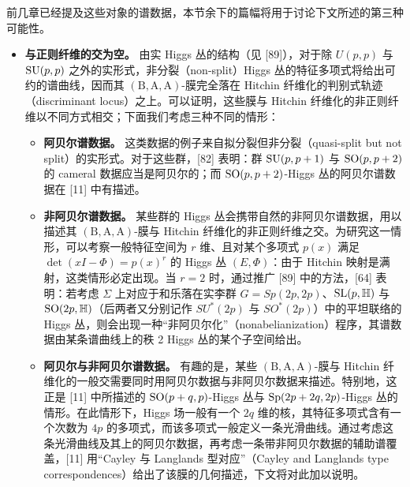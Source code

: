 
前几章已经提及这些对象的谱数据，本节余下的篇幅将用于讨论下文所述的第三种可能性。

\begin{itemize}[leftmargin=1.4em,itemsep=1pt,topsep=1pt]
\item \textbf{与正则纤维的交为空。} 由实 Higgs 丛的结构（见 [89]），对于除 $U(p,p)$ 与 $\mathrm{SU}(p,p)$ 之外的实形式，非分裂（non-split）Higgs 丛的特征多项式将给出可约的谱曲线，因而其 $(\mathrm{B},\mathrm{A},\mathrm{A})$-膜完全落在 Hitchin 纤维化的判别式轨迹（discriminant locus）之上。可以证明，这些膜与 Hitchin 纤维化的非正则纤维以不同方式相交；下面我们考虑三种不同的情形：
  \begin{itemize}[label=--,leftmargin=1.8em,itemsep=1pt,topsep=1pt]
  \item \textbf{阿贝尔谱数据。} 这类数据的例子来自拟分裂但非分裂（quasi-split but not split）的实形式。对于这些群，[82] 表明：群 $\mathrm{SU}(p,p+1)$ 与 $\mathrm{SO}(p,p+2)$ 的 cameral 数据应当是阿贝尔的；而 $\mathrm{SO}(p,p+2)$-Higgs 丛的阿贝尔谱数据在 [11] 中有描述。

  \item \textbf{非阿贝尔谱数据。} 某些群的 Higgs 丛会携带自然的非阿贝尔谱数据，用以描述其 $(\mathrm{B},\mathrm{A},\mathrm{A})$-膜与 Hitchin 纤维化的非正则纤维之交。为研究这一情形，可以考察一般特征空间为 $r$ 维、且对某个多项式 $p(x)$ 满足 $\det(xI-\Phi) = p(x)^r$ 的 Higgs 丛 $(E,\Phi)$：由于 Hitchin 映射是满射，这类情形必定出现。当 $r=2$ 时，通过推广 [89] 中的方法，[64] 表明：若考虑 $\Sigma$ 上对应于和乐落在实李群 $G = Sp(2p,2p)$、$\mathrm{SL}(p,\mathbb{H})$ 与 $\mathrm{SO}(2p,\mathbb{H})$（后两者又分别记作 $SU^*(2p)$ 与 $SO^*(2p)$）中的平坦联络的 Higgs 丛，则会出现一种“非阿贝尔化”（nonabelianization）程序，其谱数据由某条谱曲线上的秩 2 Higgs 丛的某个子空间给出。

  \item \textbf{阿贝尔与非阿贝尔谱数据。} 有趣的是，某些 $(\mathrm{B},\mathrm{A},\mathrm{A})$-膜与 Hitchin 纤维化的一般交需要同时用阿贝尔数据与非阿贝尔数据来描述。特别地，这正是 [11] 中所描述的 $\mathrm{SO}(p+q,p)$-Higgs 丛与 $\mathrm{Sp}(2p+2q,2p)$-Higgs 丛的情形。在此情形下，Higgs 场一般有一个 $2q$ 维的核，其特征多项式含有一个次数为 $4p$ 的多项式，而该多项式一般定义一条光滑曲线。通过考虑这条光滑曲线及其上的阿贝尔数据，再考虑一条带非阿贝尔数据的辅助谱覆盖，[11] 用“Cayley 与 Langlands 型对应”（Cayley and Langlands type correspondences）给出了该膜的几何描述，下文将对此加以说明。
  \end{itemize}
\end{itemize}


